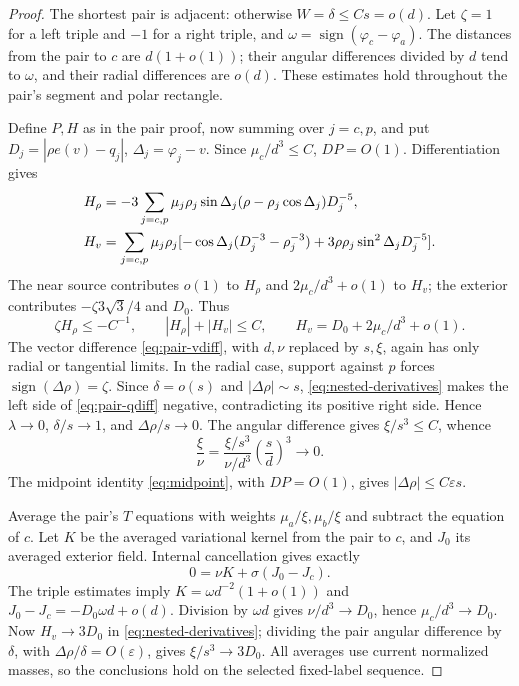 \documentclass[11pt,a4paper]{article}
\numberwithin{equation}{section}
\theoremstyle{remark}
\newcommand{\eps}{\varepsilon}
\begin{document}
\begin{proof}
The shortest pair is adjacent: otherwise $W=\delta\le Cs=o(d)$. Let $\zeta=1$ for a left triple and $-1$ for a right triple, and $\omega=\operatorname{sign}(\varphi_c-\varphi_a)$. The distances from the pair to $c$ are $d(1+o(1))$; their angular differences divided by $d$ tend to $\omega$, and their radial differences are $o(d)$. These estimates hold throughout the pair's segment and polar rectangle.

Define $P,H$ as in the pair proof, now summing over $j=c,p$, and put $D_j=|\rho e(v)-q_j|$, $\Delta_j=\varphi_j-v$. Since $\mu_c/d^3\le C$, $DP=O(1)$. Differentiation gives
\begin{align}
 H_\rho&=-3\sum_{j=c,p}\mu_j\rho_j\sin\Delta_j(\rho-\rho_j\cos\Delta_j)D_j^{-5},\label{eq:nested-field}\\
 H_v&=\sum_{j=c,p}\mu_j\rho_j[-\cos\Delta_j(D_j^{-3}-\rho_j^{-3})+3\rho\rho_j\sin^2\Delta_jD_j^{-5}].\notag
\end{align}
The near source contributes $o(1)$ to $H_\rho$ and $2\mu_c/d^3+o(1)$ to $H_v$; the exterior contributes $-\zeta3\sqrt3/4$ and $D_0$. Thus
\begin{equation}\label{eq:nested-derivatives}
 \zeta H_\rho\le-C^{-1},\qquad |H_\rho|+|H_v|\le C,
 \qquad H_v=D_0+2\mu_c/d^3+o(1).
\end{equation}
The vector difference \eqref{eq:pair-vdiff}, with $d,\nu$ replaced by $s,\xi$, again has only radial or tangential limits. In the radial case, support against $p$ forces $\operatorname{sign}(\Delta\rho)=\zeta$. Since $\delta=o(s)$ and $|\Delta\rho|\sim s$, \eqref{eq:nested-derivatives} makes the left side of \eqref{eq:pair-qdiff} negative, contradicting its positive right side. Hence $\lambda\to0$, $\delta/s\to1$, and $\Delta\rho/s\to0$. The angular difference gives $\xi/s^3\le C$, whence
\[
 \frac\xi\nu=\frac{\xi/s^3}{\nu/d^3}\left(\frac sd\right)^3\to0.
\]
The midpoint identity \eqref{eq:midpoint}, with $DP=O(1)$, gives $|\Delta\rho|\le C\eps s$.

Average the pair's $T$ equations with weights $\mu_a/\xi,\mu_b/\xi$ and subtract the equation of $c$. Let $K$ be the averaged variational kernel from the pair to $c$, and $J_0$ its averaged exterior field. Internal cancellation gives exactly
\begin{equation}\label{eq:nested-macro-average}
 0=\nu K+\sigma(J_0-J_c).
\end{equation}
The triple estimates imply $K=\omega d^{-2}(1+o(1))$ and $J_0-J_c=-D_0\omega d+o(d)$. Division by $\omega d$ gives $\nu/d^3\to D_0$, hence $\mu_c/d^3\to D_0$. Now $H_v\to3D_0$ in \eqref{eq:nested-derivatives}; dividing the pair angular difference by $\delta$, with $\Delta\rho/\delta=O(\eps)$, gives $\xi/s^3\to3D_0$. All averages use current normalized masses, so the conclusions hold on the selected fixed-label sequence.
\end{proof}
\end{document}

